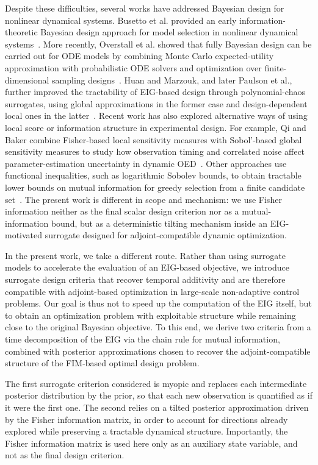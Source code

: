\documentclass[a4paper,11pt]{article}
\begin{document}
Despite these difficulties, several works have addressed Bayesian design for nonlinear dynamical systems. Busetto et al. provided an early information-theoretic Bayesian design approach for model selection in nonlinear dynamical systems~\cite{Busetto2009}. More recently, Overstall et al. showed that fully Bayesian design can be carried out for ODE models by combining Monte Carlo expected-utility approximation with probabilistic ODE solvers and optimization over finite-dimensional sampling designs~\cite{Overstall2019}. Huan and Marzouk, and later Paulson et al., further improved the tractability of EIG-based design through polynomial-chaos surrogates, using global approximations in the former case and design-dependent local ones in the latter~\cite{huanmarzouk2013,Paulson2019}. 
Recent work has also explored alternative ways of using local score or
information structure in experimental design. For example, Qi and Baker combine
Fisher-based local sensitivity measures with Sobol'-based global sensitivity
measures to study how observation timing and correlated noise affect
parameter-estimation uncertainty in dynamic OED~\cite{qi2025observationnoise}.
Other approaches use functional inequalities, such as logarithmic Sobolev
bounds, to obtain tractable lower bounds on mutual information for greedy
selection from a finite candidate set~\cite{li2024logsobolev}. The present
work is different in scope and mechanism: we use Fisher information neither
as the final scalar design criterion nor as a mutual-information bound, but
as a deterministic tilting mechanism inside an EIG-motivated surrogate
designed for adjoint-compatible dynamic optimization.

In the present work, we take a different route. Rather than using surrogate models to accelerate the evaluation of an EIG-based objective, we introduce surrogate design criteria that recover temporal additivity and are therefore compatible with adjoint-based optimization in large-scale non-adaptive control problems. Our goal is thus not to speed up the computation of the EIG itself, but to obtain an optimization problem with exploitable structure while remaining close to the original Bayesian objective. To this end, we derive two criteria from a time decomposition of the EIG via the chain rule for mutual information, combined with posterior approximations chosen to recover the adjoint-compatible structure of the FIM-based optimal design problem.

The first surrogate criterion considered is myopic and replaces each intermediate posterior distribution by the prior, so that each new observation is quantified as if it were the first one. The second relies on a tilted posterior approximation driven by the Fisher information matrix, in order to account for directions already explored while preserving a tractable dynamical structure. Importantly, the Fisher information matrix is used here only as an auxiliary state variable, and not as the final design criterion.
\end{document}
